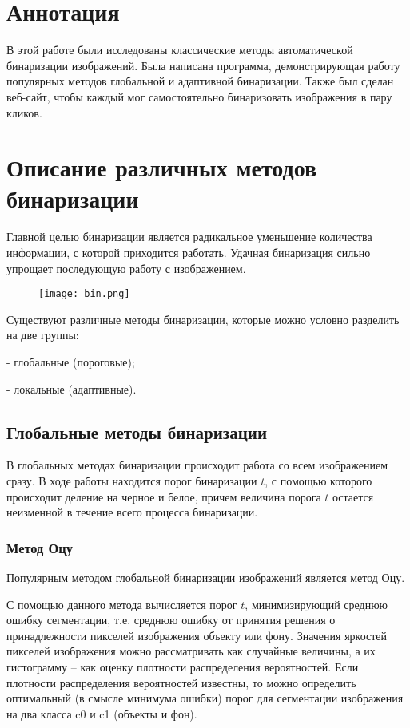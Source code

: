 \documentclass[a4paper,12pt]{article}
\begin{document}
\section{Аннотация}
В этой работе были исследованы классические методы автоматической бинаризации изображений. Была написана программа, демонстрирующая работу популярных методов глобальной и адаптивной бинаризации. Также был сделан веб-сайт, чтобы каждый мог самостоятельно бинаризовать изображения в пару кликов.
\section{Описание различных методов бинаризации}
Главной целью бинаризации является радикальное уменьшение количества информации, с которой приходится работать. Удачная бинаризация сильно упрощает последующую работу с
изображением.

\begin{figure}[h!]
    \centering	
    \texttt{[image: bin.png]}
    \label{1_1}
\end{figure}

Существуют различные методы бинаризации, которые можно условно разделить на две
группы:

- глобальные (пороговые);

- локальные (адаптивные).
\subsection{Глобальные методы бинаризации}
В глобальных методах бинаризации происходит работа со всем изображением сразу. В ходе работы находится порог бинаризации $t$, с помощью которого происходит деление на черное и белое, причем величина порога $t$ остается неизменной в течение всего процесса бинаризации.



\subsubsection*{Метод Оцу}

Популярным методом глобальной бинаризации изображений является метод Оцу.

С помощью данного метода вычисляется порог $t$, минимизирующий среднюю ошибку сегментации, т.е. среднюю ошибку от принятия решения о принадлежности пикселей
изображения объекту или фону. Значения яркостей пикселей изображения можно рассматривать как случайные величины, а их гистограмму – как оценку плотности распределения вероятностей. Если плотности распределения вероятностей известны, то можно определить оптимальный (в смысле минимума ошибки) порог для сегментации изображения на
два класса c0 и c1 (объекты и фон).
\end{document}
